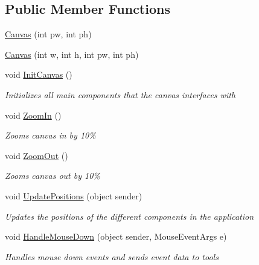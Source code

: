 \subsection*{Public Member Functions}
\begin{DoxyCompactItemize}
\item 
\mbox{\hyperlink{class_paint___program_1_1_canvas_add693d71442d497fe310ccab15a4b22f}{Canvas}} (int pw, int ph)
\item 
\mbox{\hyperlink{class_paint___program_1_1_canvas_af40bf569df831849e1c369dec074cc41}{Canvas}} (int w, int h, int pw, int ph)
\item 
void \mbox{\hyperlink{class_paint___program_1_1_canvas_ab2cd1e144d21d48fcd8e123df1b7214c}{Init\+Canvas}} ()
\begin{DoxyCompactList}\small\item\em Initializes all main components that the canvas interfaces with \end{DoxyCompactList}\item 
void \mbox{\hyperlink{class_paint___program_1_1_canvas_a2c266c354fa86bc892a2eebf183d04f3}{Zoom\+In}} ()
\begin{DoxyCompactList}\small\item\em Zooms canvas in by 10\% \end{DoxyCompactList}\item 
void \mbox{\hyperlink{class_paint___program_1_1_canvas_a6470498d99b7f3fb2d2b26116c2abb44}{Zoom\+Out}} ()
\begin{DoxyCompactList}\small\item\em Zooms canvas out by 10\% \end{DoxyCompactList}\item 
void \mbox{\hyperlink{class_paint___program_1_1_canvas_a472cbf23dbea24d0bd70e2267529307a}{Update\+Positions}} (object sender)
\begin{DoxyCompactList}\small\item\em Updates the positions of the different components in the application \end{DoxyCompactList}\item 
void \mbox{\hyperlink{class_paint___program_1_1_canvas_a08e5d5aa35c75a7e6c64db752a79df8e}{Handle\+Mouse\+Down}} (object sender, Mouse\+Event\+Args e)
\begin{DoxyCompactList}\small\item\em Handles mouse down events and sends event data to tools \end{DoxyCompactList}\item 

\end{DoxyCompactItemize}
